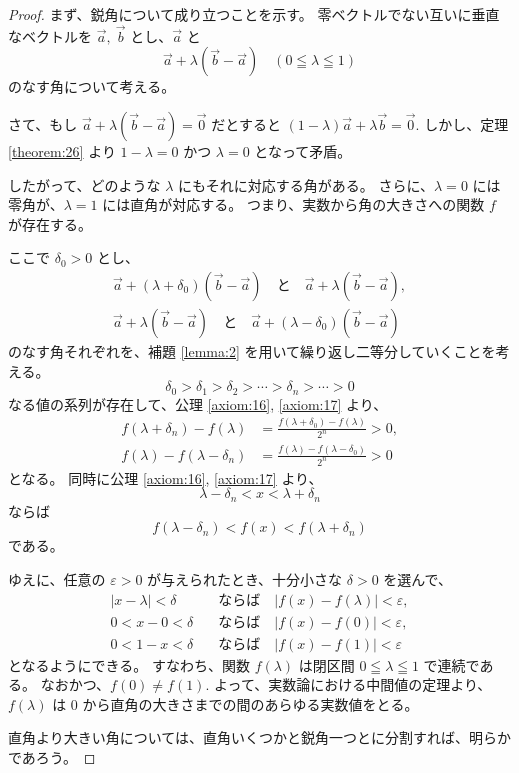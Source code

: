 \begin{proof}
  まず、鋭角について成り立つことを示す。
  零ベクトルでない互いに垂直なベクトルを \(\vec{a},\ \vec{b}\) とし、\(\vec{a}\) と
  \[\vec{a}+\lambda(\vec{b}-\vec{a}) \quad (0\leqq\lambda\leqq1)\]
  のなす角について考える。

  さて、もし \(\vec{a}+\lambda(\vec{b}-\vec{a})=\vec{0}\) だとすると \((1-\lambda)\vec{a}+\lambda\vec{b}=\vec{0}.\) しかし、定理 \ref{theorem:26} より \(1-\lambda=0\) かつ \(\lambda=0\) となって矛盾。

  したがって、どのような \(\lambda\) にもそれに対応する角がある。
  さらに、\(\lambda=0\) には零角が、\(\lambda=1\) には直角が対応する。
  つまり、実数から角の大きさへの関数 \(f\) が存在する。

  ここで \(\delta_0>0\) とし、
  \begin{gather*}
    \vec{a}+(\lambda+\delta_0)(\vec{b}-\vec{a}) \quad \text{と} \quad \vec{a}+\lambda(\vec{b}-\vec{a}), \\
    \vec{a}+\lambda(\vec{b}-\vec{a}) \quad \text{と} \quad \vec{a}+(\lambda-\delta_0)(\vec{b}-\vec{a})
  \end{gather*}
  のなす角それぞれを、補題 \ref{lemma:2} を用いて繰り返し二等分していくことを考える。
  \[\delta_0>\delta_1>\delta_2>\cdots>\delta_n>\cdots>0\]
  なる値の系列が存在して、公理 \ref{axiom:16}, \ref{axiom:17} より、
  \begin{align*}
    f(\lambda+\delta_n)-f(\lambda) &= \frac{f(\lambda+\delta_0)-f(\lambda)}{2^n}>0, \\
    f(\lambda)-f(\lambda-\delta_n) &= \frac{f(\lambda)-f(\lambda-\delta_0)}{2^n}>0
  \end{align*}
  となる。
  同時に公理 \ref{axiom:16}, \ref{axiom:17} より、
  \[\lambda-\delta_n<x<\lambda+\delta_n\]
  ならば
  \[f(\lambda-\delta_n)<f(x)<f(\lambda+\delta_n)\]
  である。

  ゆえに、任意の \(\varepsilon>0\) が与えられたとき、十分小さな \(\delta>0\) を選んで、
  \begin{align*}
    |x-\lambda|<\delta \quad & \text{ならば} \quad |f(x)-f(\lambda)|<\varepsilon, \\
          0<x-0<\delta \quad & \text{ならば} \quad |f(x)-f(0)|<\varepsilon, \\
          0<1-x<\delta \quad & \text{ならば} \quad |f(x)-f(1)|<\varepsilon
  \end{align*}
  となるようにできる。
  すなわち、関数 \(f(\lambda)\) は閉区間 \(0\leqq\lambda\leqq1\) で連続である。
  なおかつ、\(f(0)\neq f(1).\)
  よって、実数論における中間値の定理より、\(f(\lambda)\) は \(0\) から直角の大きさまでの間のあらゆる実数値をとる。

  直角より大きい角については、直角いくつかと鋭角一つとに分割すれば、明らかであろう。
\end{proof}

